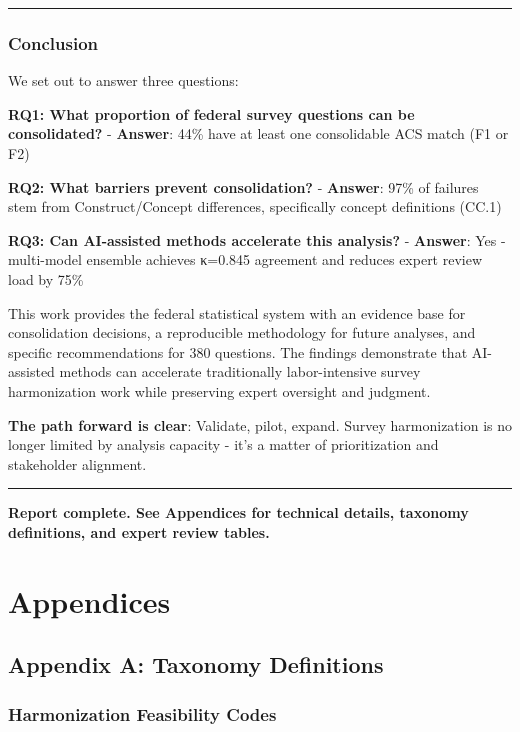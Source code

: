 \documentclass[
  letterpaper,
]{report}
\begin{document}
\begin{center}\rule{0.5\linewidth}{0.5pt}\end{center}

\section{Conclusion}\label{conclusion-1}

We set out to answer three questions:

\textbf{RQ1: What proportion of federal survey questions can be
consolidated?} - \textbf{Answer}: 44\% have at least one consolidable
ACS match (F1 or F2)

\textbf{RQ2: What barriers prevent consolidation?} - \textbf{Answer}:
97\% of failures stem from Construct/Concept differences, specifically
concept definitions (CC.1)

\textbf{RQ3: Can AI-assisted methods accelerate this analysis?} -
\textbf{Answer}: Yes - multi-model ensemble achieves κ=0.845 agreement
and reduces expert review load by 75\%

This work provides the federal statistical system with an evidence base
for consolidation decisions, a reproducible methodology for future
analyses, and specific recommendations for 380 questions. The findings
demonstrate that AI-assisted methods can accelerate traditionally
labor-intensive survey harmonization work while preserving expert
oversight and judgment.

\textbf{The path forward is clear}: Validate, pilot, expand. Survey
harmonization is no longer limited by analysis capacity - it's a matter
of prioritization and stakeholder alignment.

\begin{center}\rule{0.5\linewidth}{0.5pt}\end{center}

\textbf{Report complete. See Appendices for technical details, taxonomy
definitions, and expert review tables.}

\part{Appendices}

\chapter{Appendix A: Taxonomy
Definitions}\label{appendix-a-taxonomy-definitions}

\section{Harmonization Feasibility
Codes}\label{harmonization-feasibility-codes}
\end{document}
